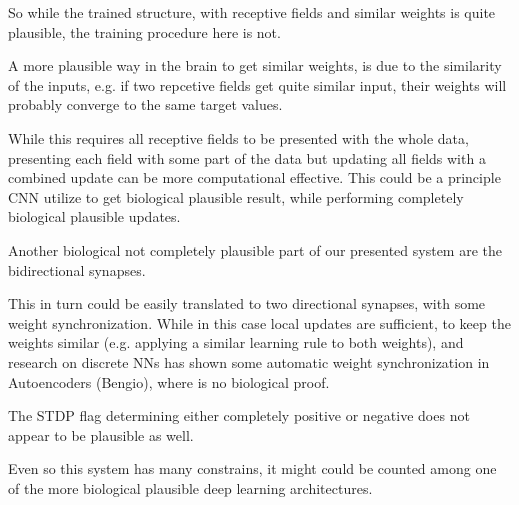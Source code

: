 So while the trained structure, with receptive fields and similar weights is quite plausible, the training procedure here is not.

A more plausible way in the brain to get similar weights, is due to the similarity of the inputs, e.g. if two repcetive fields get quite similar input, their weights will probably converge to the same target values.  

While this requires all receptive fields to be presented with the whole data, presenting each field with some part of the data but updating all fields with a combined update can be more computational effective. 
This could be a principle CNN utilize to get biological plausible result, while performing completely biological plausible updates.

Another biological not completely plausible part of our presented system are the bidirectional synapses.

This in turn could be easily translated to two directional synapses, with some weight synchronization. While in this case local updates are sufficient, to keep the weights similar (e.g. applying a similar learning rule to both weights), and research on discrete NNs has shown some automatic weight synchronization in Autoencoders (Bengio), where is no biological proof.

The STDP flag determining either completely positive or negative does not appear to be plausible as well.

Even so this system has many constrains, it might could be counted among one of the more biological plausible deep learning architectures.     




 